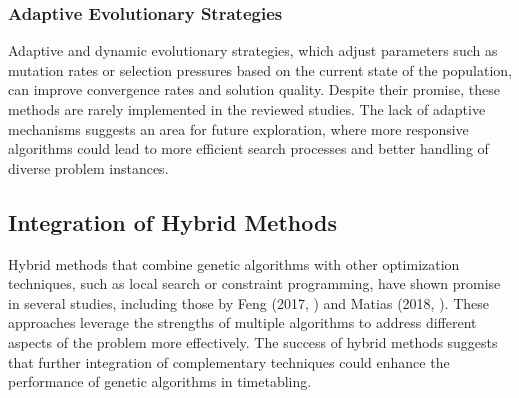 \documentclass[sigconf]{acmart}
\begin{document}
\subsubsection{Adaptive Evolutionary Strategies}
Adaptive and dynamic evolutionary strategies, which adjust parameters such as
mutation rates or selection pressures based on the current state of the
population, can improve convergence rates and solution quality.
Despite their promise, these methods are rarely implemented in the reviewed
studies. The lack of adaptive mechanisms suggests an area for future
exploration, where more responsive algorithms could lead to more efficient
search processes and better handling of diverse problem instances.


\subsection{Integration of Hybrid Methods}
Hybrid methods that combine genetic algorithms with other optimization
techniques, such as local search or constraint programming, have shown promise
in several studies, including those by Feng (2017, \cite{Feng2017}) and Matias
(2018, \cite{Matias2018fair}). These approaches leverage the strengths of
multiple algorithms to address different aspects of the problem more
effectively. The success of hybrid methods suggests that further integration of
complementary techniques could enhance the performance of genetic algorithms
in timetabling.



\end{document}
